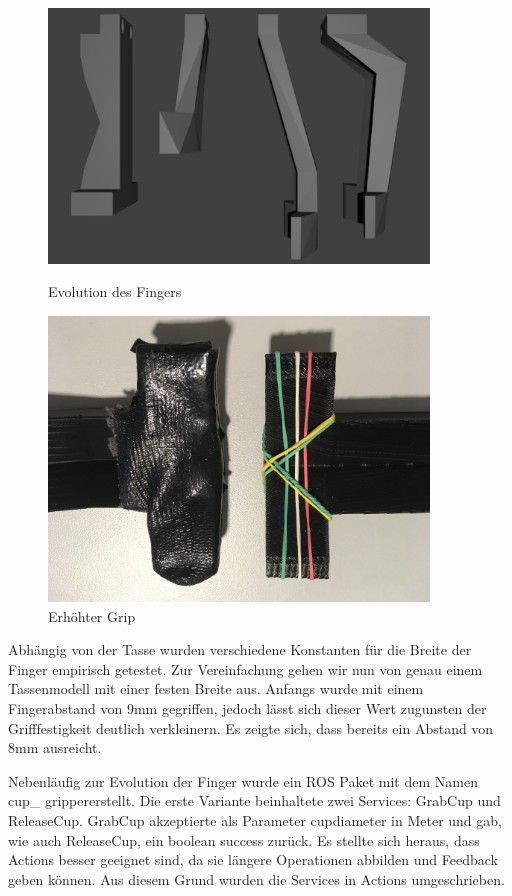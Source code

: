 \begin{figure}
    \centering
    \begin{minipage}{0.45\textwidth}
        \centering
        \includegraphics[width=0.9\textwidth]{images/finger_evolution.png} %
        \caption{Evolution des Fingers}
    \end{minipage}\hfill
    \begin{minipage}{0.45\textwidth}
        \centering
        \includegraphics[width=0.9\textwidth]{images/finger_tip.JPG} %
        \caption{Erhöhter Grip}
    \end{minipage}
\end{figure}

Abhängig von der Tasse wurden verschiedene Konstanten für die Breite der Finger empirisch getestet. Zur Vereinfachung gehen wir nun von genau einem Tassenmodell mit einer festen Breite aus. Anfangs wurde mit einem Fingerabstand von 9mm gegriffen, jedoch lässt sich dieser Wert zugunsten der Grifffestigkeit deutlich verkleinern. Es zeigte sich, dass bereits ein Abstand von 8mm ausreicht.

Nebenläufig zur Evolution der Finger wurde ein ROS Paket mit dem Namen \glqq cup\_ gripper\grqq  erstellt. Die erste Variante beinhaltete zwei Services: GrabCup und ReleaseCup. GrabCup akzeptierte als Parameter cup\textunderscore diameter in Meter und gab, wie auch ReleaseCup, ein boolean success zurück. Es stellte sich heraus, dass Actions besser geeignet sind, da sie längere Operationen abbilden und Feedback geben können. Aus diesem Grund wurden die Services in Actions umgeschrieben.

